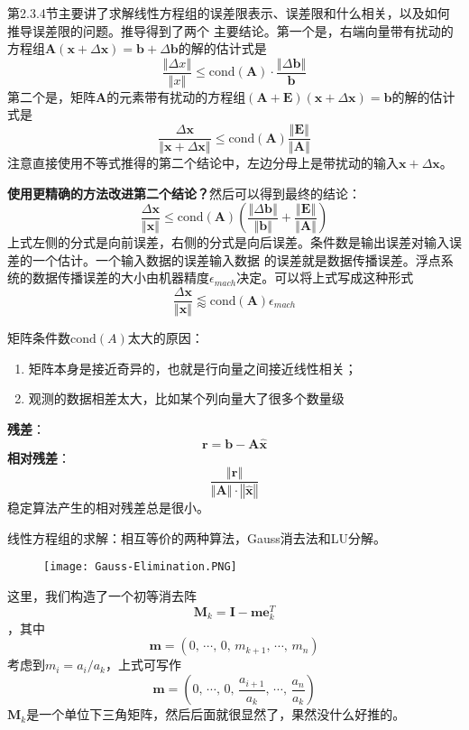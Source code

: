 \documentclass[14pt, letterpaper, UTF8, fontset=windowsnew, heading=true]{article}
\providecommand{\norm}[1]{\left\Vert#1\right\Vert}
\begin{document}
\par
第2.3.4节主要讲了求解线性方程组的误差限表示、误差限和什么相关，以及如何推导误差限的问题。推导得到了两个
主要结论。第一个是，右端向量带有扰动的方程组$\bm{A}(\bm{x}+\Delta\bm{x})=\bm{b}+\Delta\bm{b}$的解的估计式是
$$\frac{\norm{\Delta x}}{\norm{x}} \leq \text{cond}(\bm{A})\cdot \frac{\norm{\Delta \bm{b}}}{\bm{b}}$$
第二个是，矩阵$\bm{A}$的元素带有扰动的方程组$(\bm{A}+\bm{E})(\bm{x}+\Delta\bm{x})=\bm{b}$的解的估计式是
$$\frac{\Delta\bm{x}}{\norm{\bm{x}+\Delta\bm{x}}}\leq \text{cond}(\bm{A})\frac{\norm{\bm{E}}}{\norm{\bm{A}}}$$
注意直接使用不等式推得的第二个结论中，左边分母上是带扰动的输入$\bm{x}+\Delta\bm{x}$。

\par

\textbf{使用更精确的方法改进第二个结论？}然后可以得到最终的结论：
$$\frac{\Delta\bm{x}}{\norm{\bm{x}}}\leq \text{cond}(\bm{A})\left(\frac{\norm{\Delta\bm{b}}}{\norm{\bm{b}}}
+\frac{\norm{\bm{E}}}{\norm{\bm{A}}}\right)$$
上式左侧的分式是向前误差，右侧的分式是向后误差。条件数是输出误差对输入误差的一个估计。一个输入数据的误差输入数据
的误差就是数据传播误差。浮点系统的数据传播误差的大小由机器精度$\epsilon_{mach}$决定。可以将上式写成这种形式
$$\frac{\Delta\bm{x}}{\norm{\bm{x}}} \lessapprox \text{cond}(\bm{A})\epsilon_{mach}$$

\par
矩阵条件数$\text{cond}(A)$太大的原因：
\begin{enumerate}
	\item
	矩阵本身是接近奇异的，也就是行向量之间接近线性相关；
	\item
	观测的数据相差太大，比如某个列向量大了很多个数量级
\end{enumerate}

\par
\textbf{残差}：$$\bm{r}=\bm{b}-\bm{A}\hat{\bm{x}}$$
\textbf{相对残差}：$$\frac{\norm{\bm{r}}}{\norm{\bm{A}}\cdot\norm{\hat{\bm{x}}}}$$
稳定算法产生的相对残差总是很小。

\par
线性方程组的求解：相互等价的两种算法，Gauss消去法和LU分解。
\begin{figure}[h]
	\texttt{[image: Gauss-Elimination.PNG]}
	\centering
\end{figure}
这里，我们构造了一个初等消去阵
$$\bm{M}_k=\bm{I}-\bm{m}\bm{e}_k^T$$
，其中
$$\bm{m}=(0,\,\cdots,\,0,\,m_{k+1},\,\cdots,\, m_n)$$
考虑到$m_i=a_i/a_k$，上式可写作
$$\bm{m}=(0,\,\cdots,\,0,\,\frac{a_{i+1}}{a_k},\,\cdots,\, \frac{a_n}{a_k})$$
$\bm{M}_k$是一个单位下三角矩阵，然后后面就很显然了，果然没什么好推的。
\end{document}
